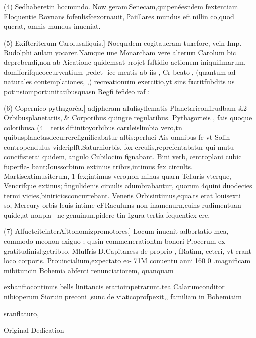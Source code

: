 \documentclass{article}
\begin{document}
{{{{{{{{(4) Sedhaberetin hocmundo. } Now geram Senecam,quipenéesndem fextentiam
Eloquentie Rovnans fofenlisfcexornauit, Paiillares mundus eft nillin co,quod qucrat,
omnis mundus inueniat.

(5) Exifteriterum Carolusaliquis.] Noequidem cogitaueram tuncfore, vein Imp.
Rudolphi aulam yocarer.Namque une Monarcham vere alterum Carolum bic deprebendi,non ab
Aicationc quidemsat projet fsftidio actionum iniquifimarum, domiforifqueoceurventium ,redet-
ice mentis ab iis , Cr beato , (quantum ad naturales contemplationes, ,) recreationuim exercitio,yt
sins fucritfubdits us potinsiomportunitatibusquasn Regfi fefideo raf :

(6) Copernico-pythagoréa.] adjpheram allufisyflematis Planetariconflrudbam
£2 Orbibusplanetariis, & Corporibus quingue regularibus. Pythagorteis , fais quoque coloribusa (4=
teris dftinitoyorbibus caruleislimbia vero,tn quibusplanetasdecurrerefignificabatur albis:perluci
Ais omnibus fc vt Solin contropendulus videripfft.Saturniorbis, fox crculis,reprefentabatur qui
mutu concifisterai quidem, angulo Cubilocim fignabant. Bini verb, centroplani cubic fuperfla-
bant;Ioussorbinm extinius tribus,intimus fex circults, Martisextimusiterum, 1 fex;intimus vero,non
minus quarn Telluris vterque, Vencrifque extinus; fingulidenis circulis adumbrabantur, quorum
4quini duodecies termi vicies,biniricicsconcurrebant. Veneris Orbisintimus,equalts erat louisexti=
so, Mercury orbis louis intime eFRaculums non inamenurn,cuins rudimentuan quide,at nonpla~
ne genuinun,pidere tin figura tertia fequentiex ere,

(7) AlfuctciteinterAfttonomizpromotores.] Locum inucnit adbortatio mea,
commodo meonon exiguo ; qusin commemerationtm bonori Procerum ex gratitudinisl:getribuo.
Mluffris D.Capitaness de proprio , fRatinn, ceteri, vt crant loco corporis. Prouincialium,expectato eo-
71M conuentu anni 160 0 .magnificam mibituncin Bohemia abfenti renunciationem, quanquam

exhanftocontinuis bells linitancis erarioimpetrarunt.tea Calarumconditor nibioperum
Sioruin preconi ,sunc de viaticoprofpexit,, familiam in Bobemiaim

sranflaturo,


Original Dedication

}}}}}}}
\end{document}
